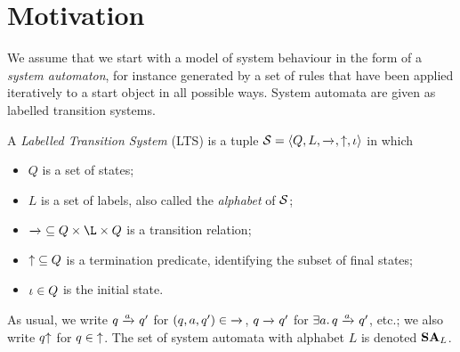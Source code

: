 \section{Motivation}
\label{sec:motivation}

We assume that we start with a model of system behaviour in the form of a \emph{system automaton}, for instance generated by a set of rules that have been applied iteratively to a start object in all possible ways. System automata are given as labelled transition systems.

\begin{definition}[LTS]\label{defL;ts}
A \emph{Labelled Transition System} (LTS) is a tuple $\cS=\tupof{Q, L, {\trans{}}, {\final}, \qinit}$ in which
\begin{itemize}
\item $Q$ is a set of states;
\item $L$ is a set of labels, also called the \emph{alphabet} of $\mathcal{S}$;
\item ${\trans{}}\subseteq Q\times\L\times Q$ is a transition relation;
\item ${{\uparrow}}\subseteq Q$ is a termination predicate, identifying the subset of final states;
\item $\iota\in Q$ is the initial state.
\end{itemize}
\end{definition}
%
As usual, we write $q\trans a q'$ for $(q,a,q')\in {\trans{}}$, $q\trans{} q'$ for $\exists a\st q\trans a q'$, etc.; we also write $q{\uparrow}$ for $q\in{{\uparrow}}$. The set of system automata with alphabet $L$ is denoted $\mathbf{SA}_L$.
\begin{comment}
We will make sure that all our constructions are well-defined up to \emph{bisimilarity} of LTSs.
%
\begin{definition}[bisimilarity]\label{def:bisimilarity}
Let $Q$ be a set of states and ${\trans{}}\subseteq Q\times L\times Q$ a transition relation. Two states $q_1,q_2\in Q$ are called \emph{bisimilar} if $q_1\simeq q_2$, where ${\simeq}\subseteq Q\times Q$ is the largest symmetric relation such that
\begin{inumerate}
\item $q_1\simeq q_2\trans a q_2'$ (for arbitrary $q_1,q_2,q_2'\in Q$) implies that there is some $q_1'\in Q$ such that $q_1\trans a q_1'\simeq q_2'$;
\item $q_1\simeq q_2\final$ (for arbitrary $q_1,q_2\in Q$) implies $q_1\final$.
\end{inumerate}

Two labelled transition systems $\cS_1,\cS_2$ with disjoint state sets are called bisimilar, denoted $\cS_1\simeq \cS_2$, if $\qinit_1\simeq \qinit_2$ in $Q=Q_1\cup Q_2$ with transition relation ${\trans{}}={\rightarrow_1}\cup {\rightarrow_2}$ and termination predicate ${\final}={\final_1}\cup {\final_2}$.
\end{definition}
\end{comment}

